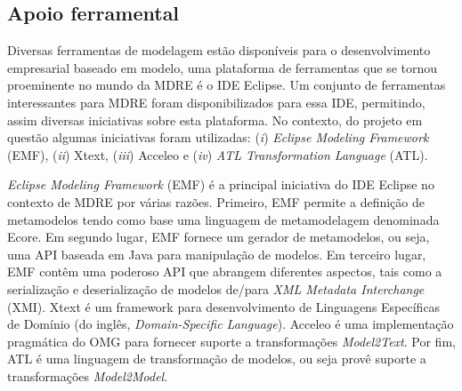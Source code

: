\subsection{Apoio ferramental}\label{sec:apoio_ferramental}

Diversas ferramentas de modelagem estão disponíveis para o desenvolvimento empresarial baseado em modelo, uma plataforma de ferramentas que se tornou proeminente no mundo da MDRE é o IDE Eclipse. Um conjunto de ferramentas interessantes para MDRE foram disponibilizados para essa IDE, permitindo, assim diversas iniciativas sobre esta plataforma. No contexto, do projeto em questão algumas iniciativas foram utilizadas: (\textit{i}) \textit{Eclipse Modeling Framework} (EMF), (\textit{ii}) Xtext, (\textit{iii}) Acceleo e (\textit{iv}) \textit{ATL Transformation Language} (ATL). 

\textit{Eclipse Modeling Framework} (EMF) é a principal iniciativa do IDE Eclipse no contexto de MDRE por várias razões. Primeiro, EMF permite a definição de metamodelos tendo como base uma linguagem de metamodelagem denominada Ecore. Em segundo lugar, EMF fornece um gerador de metamodelos, ou seja, uma API baseada em Java para manipulação de modelos. Em terceiro lugar, EMF contêm uma poderoso API que abrangem diferentes aspectos, tais como a serialização e deserialização de modelos de/para \textit{XML Metadata Interchange} (XMI). Xtext é um framework para desenvolvimento de Linguagens Específicas de Domínio (do inglês, \textit{Domain-Specific Language}). Acceleo é uma implementação pragmática do OMG para fornecer suporte a transformações \textit{Model2Text}. Por fim, ATL é uma linguagem de transformação de modelos, ou seja provê suporte a transformações \textit{Model2Model}. 










